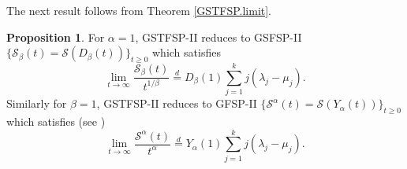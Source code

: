 \documentclass[11pt,oneside,reqno]{amsart}
\theoremstyle{definition}
\newtheorem{remark}{\bf Remark}[section]
\newtheorem{proposition}{Proposition}[section]
\theoremstyle{remarkstyle}
\begin{document}
The next result follows from Theorem \ref{GSTFSP.limit}.
\begin{proposition}\label{limit.GSFSP-II.GFSP-II}
For $\alpha=1$, GSTFSP-II reduces to GSFSP-II $\{\mathcal{S}_{\beta}(t)=\mathcal{S}(D_\beta(t))\}_{t\geq 0}$ which satisfies 
\begin{equation*}
\lim_{t\rightarrow\infty}\frac{\mathcal{S}_{\beta}(t)}{t^{1/\beta}} \overset{d}{=} D_\beta(1)\sum_{j=1}^{k}j(\lambda_j-\mu_j).
\end{equation*}
Similarly for $\beta=1$, GSTFSP-II reduces to GFSP-II $\{\mathcal{S}^{\alpha}(t)=\mathcal{S}(Y_{\alpha}(t))\}_{t\ge 0}$ which satisfies (see \citet{Kataria2022b})
\begin{equation*}
\lim_{t\rightarrow\infty}\frac{\mathcal{S}^{\alpha}(t)}{t^{\alpha}} \overset{d}{=} Y_{\alpha}(1)\sum_{j=1}^{k}j(\lambda_j-\mu_j).
\end{equation*}
\end{proposition}
\end{document}
